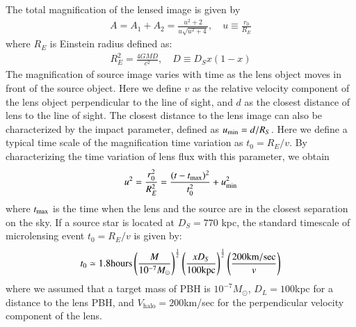 \documentclass[iop, apj]{emulateapj}
\newcommand{\?}{\stackrel{?}{=}}
\begin{document}
The total magnification of the lensed image is given by 
% 
\begin{eqnarray}
A=A_{1}+A_{2}=\frac{u^2+2}{u\sqrt{u^2+4}}, \quad u\equiv\frac{r_0}{R_E}
\label{eq:cano}
\end{eqnarray}
%
%
where $R_E$ is Einstein radius defined as:  %
\begin{eqnarray}
R^2_E=\frac{4GMD}{c^2},\quad D\equiv D_S x(1-x)
\end{eqnarray}
%
The magnification of source image varies with time as the lens object moves in front of the source object. Here we define $v$ as the relative velocity component of the lens object perpendicular to the line of sight, and $d$ as the closest distance of lens to the line of sight. The closest distance to the lens image can also be characterized by the impact parameter, defined as $u_{\rm min}={d}/{R_S}$. 
Here we define a typical time scale of the magnification time variation as $t_0={R_E}/{v}$. 
By characterizing the time variation of lens flux with this parameter, we obtain 
%
%
%
\begin{eqnarray}
u^2=\frac{r^2_0}{R^2_E}=\frac{(t-t_{\rm max})^2}{t^2_0}+u^2_{\rm min}
\label{eq:cimpa}
\end{eqnarray}
%
where $t_{\rm max}$ is the time when the lens and the source are in the closest separation on the sky. 
%
%
%
%
If a source star is located at $D_S=770$ {kpc}, the standard timescale of microlensing event  $t_0={R_E}/{v}$ %
is given by: 
%
\begin{eqnarray}
t_0\simeq1.8{\rm hours} \left(\frac{M}{10^{-7}M_\odot}\right)^{\frac{1}{2}}\left(\frac{xD_S}{100 \rm{kpc}}\right)^{\frac{1}{2}} \left(\frac{200 {\rm km/sec}}{v}\right)
\end{eqnarray}
%
where we assumed that a target mass of PBH is $10^{-7}M_\odot$, $D_L=100$kpc for a distance to the lens PBH, and $V_\mathrm{halo}=200$km/sec for the perpendicular velocity component of the lens. 
\end{document}
